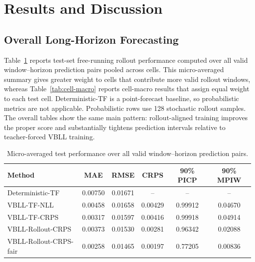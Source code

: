\documentclass[conference]{IEEEtran}
\begin{document}
\section{Results and Discussion}

\subsection{Overall Long-Horizon Forecasting}

Table~\ref{tab:overall} reports test-set free-running rollout performance
computed over all valid window--horizon prediction pairs pooled across cells.
This micro-averaged summary gives greater weight to cells that contribute more
valid rollout windows, whereas Table~\ref{tab:cell-macro} reports cell-macro
results that assign equal weight to each test cell. Deterministic-TF is a
point-forecast baseline, so probabilistic metrics are not applicable.
Probabilistic rows use 128 stochastic rollout samples. The overall tables show
the same main pattern: rollout-aligned training improves the proper score and
substantially tightens prediction intervals relative to teacher-forced VBLL
training.

\begin{table}[t]
\centering
\scriptsize
\caption{Micro-averaged test performance over all valid window--horizon
prediction pairs.}
\label{tab:overall}
\setlength{\tabcolsep}{3pt}
\begin{tabular}{@{}lccccc@{}}
\toprule
Method & MAE & RMSE & CRPS & 90\% PICP & 90\% MPIW \\
\midrule
Deterministic-TF & 0.00750 & 0.01671 & -- & -- & -- \\
VBLL-TF-NLL & 0.00458 & 0.01658 & 0.00429 & 0.99912 & 0.04670 \\
VBLL-TF-CRPS & 0.00317 & 0.01597 & 0.00416 & 0.99918 & 0.04914 \\
VBLL-Rollout-CRPS & 0.00373 & 0.01530 & 0.00281 & 0.96342 & 0.02088 \\
VBLL-Rollout-CRPS-fair & 0.00258 & 0.01465 & 0.00197 & 0.77205 & 0.00836 \\
\bottomrule
\end{tabular}
\end{table}
\end{document}
